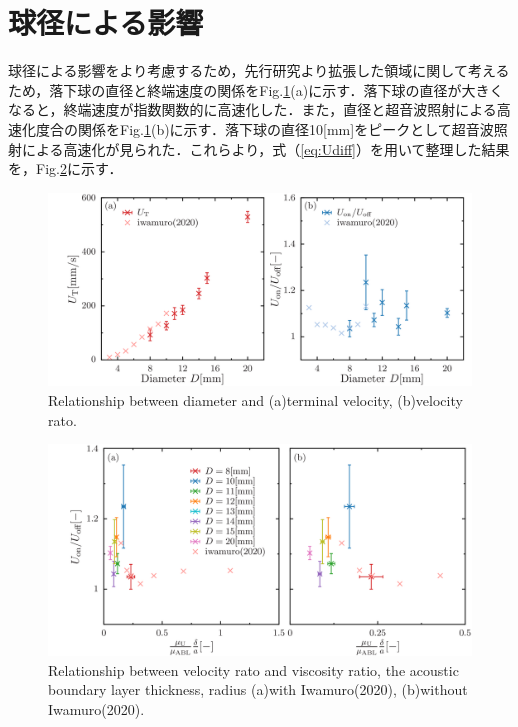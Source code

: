 \section{球径による影響}

球径による影響をより考慮するため，先行研究より拡張した領域に関して考えるため，落下球の直径と終端速度の関係をFig.\ref{fig:diaUT}(a)に示す．落下球の直径が大きくなると，終端速度が指数関数的に高速化した．また，直径と超音波照射による高速化度合の関係をFig.\ref{fig:diaUT}(b)に示す．落下球の直径10[mm]をピークとして超音波照射による高速化が見られた．これらより，式（\ref{eq:Udiff}）を用いて整理した結果を，Fig.\ref{fig:muUdiff}に示す．

\begin{figure}[ht]
    \centering
    \includegraphics[width=14cm,clip]{./5-Results/diameter/diaUT_Udiff.png}
    \caption{Relationship between diameter and (a)terminal velocity, (b)velocity rato.}
    \label{fig:diaUT}
\end{figure}

\begin{figure}[ht]
    \centering
    \includegraphics[width=14cm,clip]{./5-Results/diameter/mu_Udiff.png}
    \caption{Relationship between velocity rato and viscosity ratio, the acoustic boundary layer thickness, radius (a)with Iwamuro(2020), (b)without Iwamuro(2020).}
    \label{fig:muUdiff}
\end{figure}